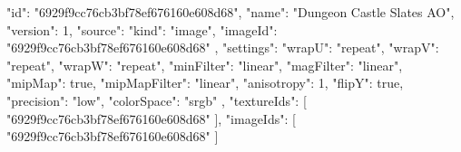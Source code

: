 {
  "id": "6929f9cc76cb3bf78ef676160e608d68",
  "name": "Dungeon Castle Slates AO",
  "version": 1,
  "source": {
    "kind": "image",
    "imageId": "6929f9cc76cb3bf78ef676160e608d68"
  },
  "settings": {
    "wrapU": "repeat",
    "wrapV": "repeat",
    "wrapW": "repeat",
    "minFilter": "linear",
    "magFilter": "linear",
    "mipMap": true,
    "mipMapFilter": "linear",
    "anisotropy": 1,
    "flipY": true,
    "precision": "low",
    "colorSpace": "srgb"
  },
  "textureIds": [
    "6929f9cc76cb3bf78ef676160e608d68"
  ],
  "imageIds": [
    "6929f9cc76cb3bf78ef676160e608d68"
  ]
}

